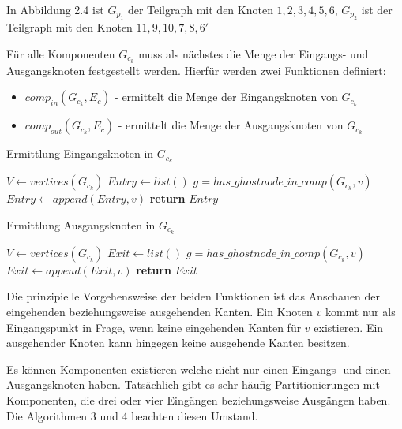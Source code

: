 \begin{bem}
  In Abbildung 2.4 ist $G_{p_1}$ der Teilgraph mit den Knoten $1,2,3,4,5,6$, $G_{p_2}$ ist der Teilgraph
  mit den Knoten
  $11,9,10,7,8,6'$
\end{bem}
Für alle Komponenten $G_{c_k}$ muss als nächstes die Menge der Eingangs- und
Ausgangsknoten festgestellt werden. Hierfür werden zwei Funktionen
definiert:
\begin{itemize}
  \item $comp_{in}(G_{c_k}, E_c)$ - ermittelt die Menge der
    Eingangsknoten von $G_{c_k}$ 
  \item $comp_{out}(G_{c_k}, E_c)$ - ermittelt die Menge der
    Ausgangsknoten von $G_{c_k}$ 
\end{itemize}
\newpage
\begin{algorithm}
  \caption{Ermittlung Eingangsknoten in $G_{c_k}$}\label{alg:comp_in}
\begin{algorithmic}[1]
    \State $V \gets vertices(G_{c_k})$
    \State $Entry \gets list()$
      \State $g = has\_ghostnode\_in\_comp(G_{c_k}, v)$
        \State $Entry \gets append(Entry, v)$
      \EndIf
    \EndForeach
    \State \textbf{return} $Entry$
  \EndProcedure
\end{algorithmic}
\end{algorithm}
\begin{algorithm}
\caption{Ermittlung Ausgangsknoten in $G_{c_k}$}\label{alg:comp_out}
\begin{algorithmic}[1]
    \State $V \gets vertices(G_{c_k})$
    \State $Exit \gets list()$
      \State $g = has\_ghostnode\_in\_comp(G_{c_k}, v)$
        \State $Exit \gets append(Exit, v)$
      \EndIf
    \EndForeach
    \State \textbf{return} $Exit$
  \EndProcedure
\end{algorithmic}
\end{algorithm}
Die prinzipielle Vorgehensweise der beiden Funktionen ist das Anschauen
der eingehenden beziehungsweise ausgehenden Kanten. Ein Knoten $v$ kommt
nur als Eingangspunkt in Frage, wenn keine eingehenden Kanten für $v$
existieren. Ein ausgehender Knoten kann hingegen keine ausgehende Kanten
besitzen.
\begin{bem}
  Es können Komponenten existieren welche nicht nur einen Eingangs- und
  einen Ausgangsknoten haben. Tatsächlich gibt es sehr häufig
  Partitionierungen mit Komponenten, die drei oder vier Eingängen
  beziehungsweise Ausgängen haben. Die Algorithmen 3 und 4 beachten
  diesen Umstand.
\end{bem}
